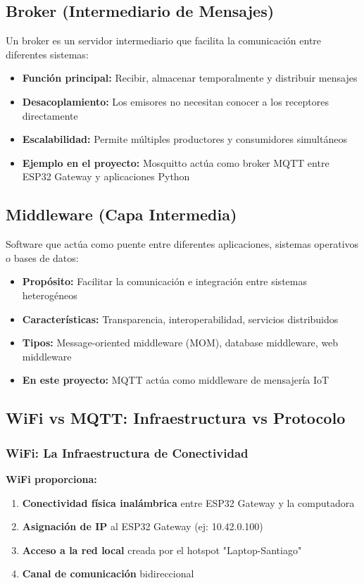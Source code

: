 \documentclass[12pt]{article}
\begin{document}
\subsection{Broker (Intermediario de Mensajes)}
Un broker es un servidor intermediario que facilita la comunicación entre diferentes sistemas:

\begin{itemize}
    \item \textbf{Función principal:} Recibir, almacenar temporalmente y distribuir mensajes
    \item \textbf{Desacoplamiento:} Los emisores no necesitan conocer a los receptores directamente
    \item \textbf{Escalabilidad:} Permite múltiples productores y consumidores simultáneos
    \item \textbf{Ejemplo en el proyecto:} Mosquitto actúa como broker MQTT entre ESP32 Gateway y aplicaciones Python
\end{itemize}

\subsection{Middleware (Capa Intermedia)}
Software que actúa como puente entre diferentes aplicaciones, sistemas operativos o bases de datos:

\begin{itemize}
    \item \textbf{Propósito:} Facilitar la comunicación e integración entre sistemas heterogéneos
    \item \textbf{Características:} Transparencia, interoperabilidad, servicios distribuidos
    \item \textbf{Tipos:} Message-oriented middleware (MOM), database middleware, web middleware
    \item \textbf{En este proyecto:} MQTT actúa como middleware de mensajería IoT
\end{itemize}

\subsection{WiFi vs MQTT: Infraestructura vs Protocolo}

\subsubsection{WiFi: La Infraestructura de Conectividad}
\textbf{WiFi proporciona:}
\begin{enumerate}
    \item \textbf{Conectividad física inalámbrica} entre ESP32 Gateway y la computadora
    \item \textbf{Asignación de IP} al ESP32 Gateway (ej: 10.42.0.100)
    \item \textbf{Acceso a la red local} creada por el hotspot "Laptop-Santiago"
    \item \textbf{Canal de comunicación} bidireccional
\end{enumerate}
\end{document}

